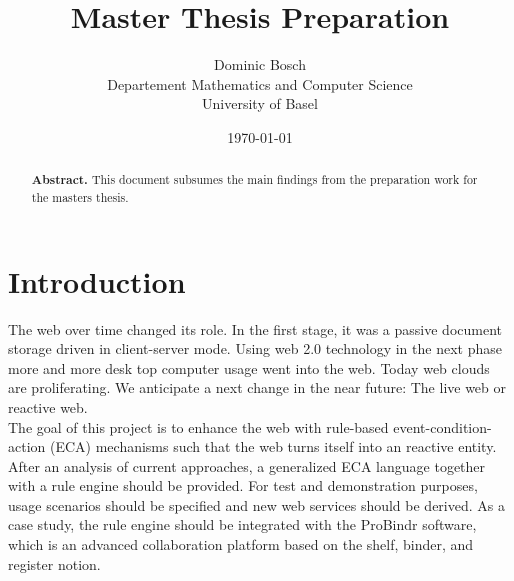 \documentclass[11pt,twocolumn]{article}
\begin{document}
\title{Master Thesis Preparation}
\date{\today}
\author{Dominic Bosch \\ Departement Mathematics and Computer Science \\ University of Basel}

\maketitle
\renewcommand{\abstractname}{}
\begin{abstract}
\textbf{Abstract.} This document subsumes the main findings from the preparation work for the masters thesis.
\end{abstract}

\section{Introduction}
The web over time changed its role. In the first stage, it was a passive document storage driven in client-server mode. Using web 2.0 technology in the next phase more and more desk top computer usage went into the web. Today web clouds are proliferating. We anticipate a next change in the near future: The live web or reactive web.
\\
The goal of this project is to enhance the web with rule-based event-condition-action (ECA) mechanisms  such that the web turns itself into an reactive entity. After an analysis of current approaches, a generalized ECA language together with a rule engine should be provided. For test and demonstration purposes, usage scenarios should be specified and new web services should be derived. As a case study, the rule engine should be integrated with the ProBindr software, which is an advanced collaboration platform based on the shelf, binder, and register notion.
\end{document}
